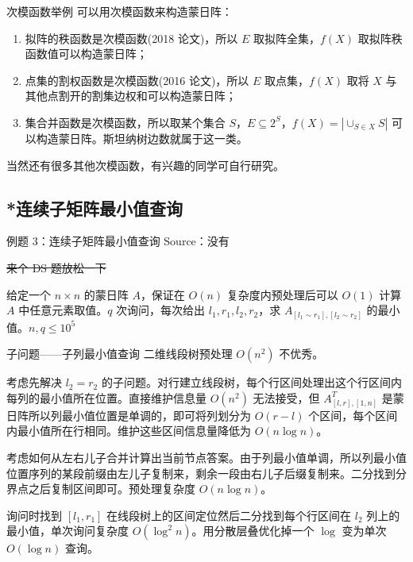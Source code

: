 \documentclass{beamer}
\begin{document}
\begin{frame}{次模函数举例}
	可以用次模函数来构造蒙日阵：
	\begin{enumerate}
		\item 拟阵的秩函数是次模函数(2018 论文)，所以 $E$ 取拟阵全集，$f(X)$ 取拟阵秩函数值可以构造蒙日阵；
		\item 点集的割权函数是次模函数(2016 论文)，所以 $E$ 取点集，$f(X)$ 取将 $X$ 与其他点割开的割集边权和可以构造蒙日阵；
		\item 集合并函数是次模函数，所以取某个集合 $S$，$E \subseteq 2^S$，$f(X) = |\cup_{S \in X} S|$ 可以构造蒙日阵。斯坦纳树边数就属于这一类。
	\end{enumerate}
	当然还有很多其他次模函数，有兴趣的同学可自行研究。
\end{frame}
\subsection{*连续子矩阵最小值查询}
\begin{frame}{例题 3：连续子矩阵最小值查询}
	Source：没有
	
	\sout{来个 DS 题放松一下}
	
	给定一个 $n \times n$ 的蒙日阵 $A$，保证在 $O(n)$ 复杂度内预处理后可以 $O(1)$ 计算 $A$ 中任意元素取值。$q$ 次询问，每次给出 $l_1,r_1,l_2,r_2$，求 $A_{[l_1 \sim r_1],[l_2 \sim r_2]}$ 的最小值。$n,q \leq 10^5$
\end{frame}
\begin{frame}{子问题——子列最小值查询}
	二维线段树预处理 $O(n^2)$ 不优秀。
	
	考虑先解决 $l_2=r_2$ 的子问题。对行建立线段树，每个行区间处理出这个行区间内每列的最小值所在位置。直接维护信息量 $O(n^2)$ 无法接受，但 $A_{[l,r],[1,n]}^T$ 是蒙日阵所以列最小值位置是单调的，即可将列划分为 $O(r-l)$ 个区间，每个区间内最小值所在行相同。维护这些区间信息量降低为 $O(n \log n)$。\pause
	
	考虑如何从左右儿子合并计算出当前节点答案。由于列最小值单调，所以列最小值位置序列的某段前缀由左儿子复制来，剩余一段由右儿子后缀复制来。二分找到分界点之后复制区间即可。预处理复杂度 $O(n \log n)$。
	
	询问时找到 $[l_1,r_1]$ 在线段树上的区间定位然后二分找到每个行区间在 $l_2$ 列上的最小值，单次询问复杂度 $O(\log^2 n)$。用分散层叠优化掉一个 $\log$ 变为单次 $O(\log n)$ 查询。
\end{frame}
\end{document}
